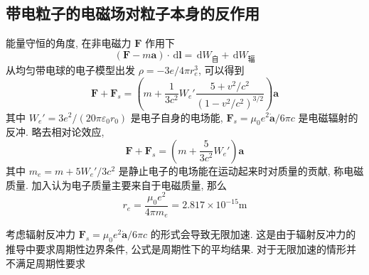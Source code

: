 \documentclass[12pt,a4paper]{article}%
\numberwithin{equation}{section}%
\renewcommand*{\vec}[1]{\bm{#1}}%
\newcommand{\dif}{\,\mathrm d}
\begin{document}
\subsection{带电粒子的电磁场对粒子本身的反作用} %
\label{sub:self_interaction}
能量守恒的角度, 在非电磁力 $\vec F$ 作用下
\begin{equation}
    (\vec F - m\vec a)\cdot \dif\vec l = \dif W_{\mbox{自}} + \dif W_{\mbox{辐}}
\end{equation}
从均匀带电球的电子模型出发 $\rho = -3e/4\pi r_e^3$, 可以得到
\begin{equation}
    \vec F +　\vec F_s = \left(m + \frac 1{3c^2}W_e'\frac{5+v^2/c^2}{(1-v^2/c^2)^{3/2}}\right)\vec a
\end{equation}
其中 $W_e' = 3e^2/(20\pi\varepsilon_0 r_0)$ 是电子自身的电场能, $\vec F_s = \mu_0 e^2\dot{\vec a}/6\pi c$ 是电磁辐射的反冲. 略去相对论效应, 
\begin{equation}
    \vec F +　\vec F_s = \left(m + \frac 5{3c^2}W_e'\right)\vec a
\end{equation}
其中 $m_e = m + 5W_e'/3c^2$ 是静止电子的电场能在运动起来时对质量的贡献, 称电磁质量. 加入认为电子质量主要来自于电磁质量, 那么
\begin{equation}
    r_e = \frac{\mu_0 e^2}{4\pi m_e} = 2.817\times 10^{-15}\mathrm m
\end{equation}

考虑辐射反冲力 $\vec F_s = \mu_0 e^2\dot{\vec a}/6\pi c$ 的形式会导致无限加速. 这是由于辐射反冲力的推导中要求周期性边界条件, 公式是周期性下的平均结果. 对于无限加速的情形并不满足周期性要求
\end{document}
